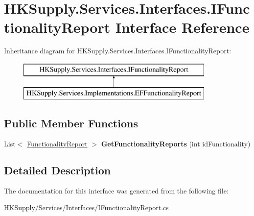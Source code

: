 \hypertarget{interface_h_k_supply_1_1_services_1_1_interfaces_1_1_i_functionality_report}{}\section{H\+K\+Supply.\+Services.\+Interfaces.\+I\+Functionality\+Report Interface Reference}
\label{interface_h_k_supply_1_1_services_1_1_interfaces_1_1_i_functionality_report}


 


Inheritance diagram for H\+K\+Supply.\+Services.\+Interfaces.\+I\+Functionality\+Report\+:\begin{figure}[H]
\begin{center}
\leavevmode
\includegraphics[height=2.000000cm]{interface_h_k_supply_1_1_services_1_1_interfaces_1_1_i_functionality_report}
\end{center}
\end{figure}
\subsection*{Public Member Functions}
\begin{DoxyCompactItemize}
\item 
\mbox{\label{interface_h_k_supply_1_1_services_1_1_interfaces_1_1_i_functionality_report_a7a541357c70f99dc2bb851ec53f4c66b}} 
List$<$ \mbox{\hyperlink{class_h_k_supply_1_1_models_1_1_functionality_report}{Functionality\+Report}} $>$ {\bfseries Get\+Functionality\+Reports} (int id\+Functionality)
\end{DoxyCompactItemize}


\subsection{Detailed Description}




The documentation for this interface was generated from the following file\+:\begin{DoxyCompactItemize}
\item 
H\+K\+Supply/\+Services/\+Interfaces/I\+Functionality\+Report.\+cs\end{DoxyCompactItemize}
